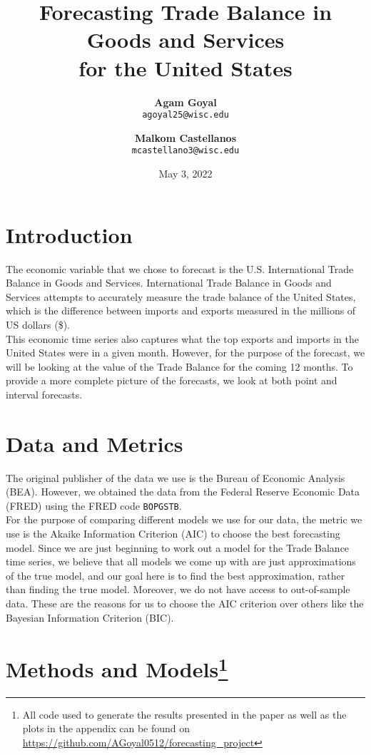 \documentclass[12pt]{article}
\title{\vspace{-3cm}Forecasting Trade Balance in Goods and Services\\ for the United States}
\author{
  \textbf{Agam Goyal}\\
  \texttt{agoyal25@wisc.edu}
  \and
  \textbf{Malkom Castellanos}\\
  \texttt{mcastellano3@wisc.edu}
}
\date{May 3, 2022}
\begin{document}
\maketitle

\section{Introduction}

The economic variable that we chose to forecast is the U.S. International Trade Balance in Goods and Services. International Trade Balance in Goods and Services attempts to accurately measure the trade balance of the United States, which is the difference between imports and exports measured in the millions of US dollars (\$).\\

This economic time series also captures what the top exports and imports in the United States were in a given month. However, for the purpose of the forecast, we will be looking at the value of the Trade Balance for the coming 12 months. To provide a more complete picture of the forecasts, we look at both point and interval forecasts.

\section{Data and Metrics}

The original publisher of the data we use is the Bureau of Economic Analysis (BEA). However, we obtained the data from the Federal Reserve Economic Data (FRED)\cite{data} using the FRED code \texttt{BOPGSTB}.\\

For the purpose of comparing different models we use for our data, the metric we use is the Akaike Information Criterion (AIC) to choose the best forecasting model. Since we are just beginning to work out a model for the Trade Balance time series, we believe that all models we come up with are just approximations of the true model, and our goal here is to find the best approximation, rather than finding the true model\cite{aic}. Moreover, we do not have access to out-of-sample data. These are the reasons for us to choose the AIC criterion over others like the Bayesian Information Criterion (BIC).

\section{Methods and Models\footnote{All code used to generate the results presented in the paper as well as the plots in the appendix can be found on \url{https://github.com/AGoyal0512/forecasting_project}}}
\end{document}
